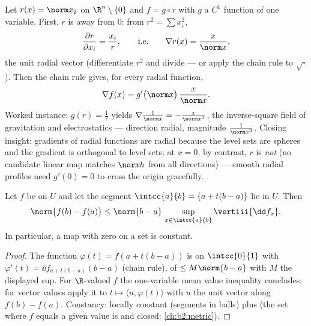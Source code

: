 \begin{example}\label{ex:b2:diffcalc:radial}
Let $r(x) = \norm x_2$ on $\R^n\setminus\{0\}$ and $f = g \circ
r$ with $g$ a $C^1$ function of one variable. First, $r$ is
 away from $0$: from $r^2 = \sum x_i^2$,
\[
\frac{\partial r}{\partial x_i} = \frac{x_i}{r},
\qquad\text{i.e.}\qquad
\nabla r(x) = \frac{x}{\norm x} ,
\]
the unit radial vector (differentiate $r^2$ and divide --- or
apply the chain rule to $\sqrt{\cdot}$). Then the chain rule
gives, for every radial function,
\[
\nabla f(x) = g'\bigl(\norm x\bigr)\,\frac{x}{\norm x} .
\]
Worked instance: $g(r) = \frac1r$ yields $\nabla\frac{1}{\norm
x} = -\frac{x}{\norm x^3}$, the inverse-square field of
gravitation and electrostatics --- direction radial, magnitude
$\frac{1}{\norm x^2}$. Closing insight: gradients of radial
functions are radial because the level sets are spheres and
the gradient is orthogonal to level sets; at $x = 0$, by
contrast, $r$ is \emph{not}  (no candidate
linear map matches $\norm h$ from all directions) --- smooth
radial profiles need $g'(0) = 0$ to cross the origin
gracefully.
\end{example}

\begin{theorem}\label{thm:b2:diffcalc:mvi}
Let $f$ be  on $U$ and let the segment $\intcc{a}{b}
= \{a + t(b-a)\}$ lie in $U$. Then
\[
\norm{f(b) - f(a)} \leq \norm{b - a}\,
\sup_{x \in \intcc{a}{b}} \vertiii{\dd f_x} .
\]
In particular, a  map with zero  on a
\emph{}  set is constant.
\end{theorem}

\begin{proof}
The function $\varphi(t) = f(a + t(b-a))$ is  on
$\intcc{0}{1}$ with $\varphi'(t) = \dd f_{a + t(b-a)}(b - a)$
(chain rule), of  $\leq M\norm{b-a}$ with $M$ the displayed
sup. For $\R$-valued $f$ the one-variable mean value inequality
concludes; for vector values apply it to $t \mapsto \langle u,
\varphi(t)\rangle$ with $u$ the unit vector along $f(b) - f(a)$.
Constancy: locally constant (segments in balls) plus 
(the set where $f$ equals a given value is  and closed:
\cref{ch:b2:metric}).
\end{proof}

